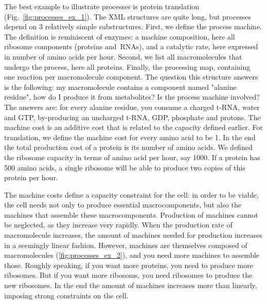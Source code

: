 The best example to illustrate processes is protein translation
(Fig.~\ref{fig:processes_ex_1}).
The XML structures are quite long, but processes depend on 3 relatively
simple substructures.
First, we define the process machine.
The definition is reminiscent of enzymes:
a machine composition, here all ribosome components (proteins and RNAs),
and a catalytic rate, here expressed in number of amino acids per hour.
Second, we list all macromolecules that undergo the process, here all proteins.
Finally, the processing map, containing one reaction per macromolecule component.
The question this structure answers is the following:
my macromolecule contains a component named "alanine residue",
how do I produce it from metabolites? Is the process machine involved?
The answers are: for every alanine residue, you consume a charged t-RNA,
water and GTP, by-producing an uncharged t-RNA, GDP, phosphate and protons.
The machine cost is an additive cost that is related to the capacity defined earlier.
For translation, we define the machine cost for every amino acid to be 1.
In the end the total production cost of a protein is its number of amino acids.
We defined the ribosome capacity in terms of amino acid per hour, say 1000.
If a protein has 500 amino acids, a single ribosome will be able to produce
two copies of this protein per hour.

The machine costs define a capacity constraint for the cell:
in order to be viable, the cell needs not only to produce essential macrocomponents,
but also the machines that assemble these macrocomponents.
Production of machines cannot be neglected, as they increase very rapidly.
When the production rate of macromolecule increases,
the amount of machines needed for production increases in a seemingly linear fashion.
However, machines are themselves composed of macromolecules (\ref{fig:processes_ex_2}),
and you need more machines to assemble those.
Roughly speaking, if you want more proteins, you need to produce more ribosomes.
But if you want more ribosoms, you need ribosomes to produce the new ribosomes.
In the end the amount of machines increases more than linearly,
imposing strong constraints on the cell.

